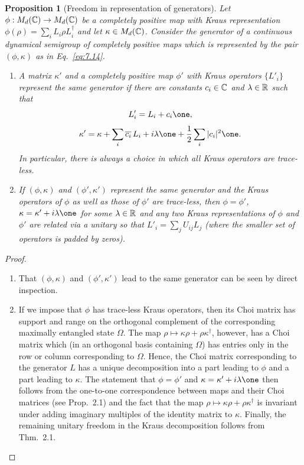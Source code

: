 \documentclass[11pt,a4paper]{article}
\theoremstyle{plain}
\newtheorem{proposition}{Proposition}
\begin{document}
\begin{proposition}[Freedom in representation of generators]
    Let $\phi:M_d(\mathbb{C})\to M_d(\mathbb{C})$ be a completely positive map with Kraus representation $\phi(\rho)=\sum_i L_i\rho L_i^{\dagger}$ and let $\kappa\in M_d(\mathbb{C})$. Consider the generator of a continuous dynamical semigroup of completely positive maps which is represented by the pair $(\phi,\kappa)$ as in Eq.~\eqref{eq:7.14}.
    \begin{enumerate}
        \item A matrix $\kappa'$ and a completely positive map $\phi'$ with Kraus operators $\{L'_i\}$ represent the same generator if there are constants $c_i\in\mathbb{C}$ and $\lambda\in\mathbb{R}$ such that
              \begin{equation}\label{eq:7.18}
                  L'_i = L_i + c_i\one,
              \end{equation}
              \begin{equation}\label{eq:7.19}
                  \kappa' = \kappa + \sum_i \overline{c_i}\,L_i + i\lambda\one + \frac12\sum_i |c_i|^2\one.
              \end{equation}
              In particular, there is always a choice in which all Kraus operators are trace-less.
        \item If $(\phi,\kappa)$ and $(\phi',\kappa')$ represent the same generator and the Kraus operators of $\phi$ as well as those of $\phi'$ are trace-less, then $\phi=\phi'$, $\kappa=\kappa'+i\lambda\one$ for some $\lambda\in\mathbb{R}$ and any two Kraus representations of $\phi$ and $\phi'$ are related via a unitary so that $L'_i=\sum_j U_{ij}L_j$ (where the smaller set of operators is padded by zeros).
    \end{enumerate}
\end{proposition}

\begin{proof}
    \begin{enumerate}
        \item That $(\phi,\kappa)$ and $(\phi',\kappa')$ lead to the same generator can be seen by direct inspection.
        \item If we impose that $\phi$ has trace-less Kraus operators, then its Choi matrix has support and range on the orthogonal complement of the corresponding maximally entangled state $\Omega$. The map $\rho\mapsto \kappa\rho+\rho\kappa^{\dagger}$, however, has a Choi matrix which (in an orthogonal basis containing $\Omega$) has entries only in the row or column corresponding to $\Omega$. Hence, the Choi matrix corresponding to the generator $L$ has a unique decomposition into a part leading to $\phi$ and a part leading to $\kappa$. The statement that $\phi=\phi'$ and $\kappa=\kappa'+i\lambda\one$ then follows from the one-to-one correspondence between maps and their Choi matrices (see Prop.~2.1) and the fact that the map $\rho\mapsto \kappa\rho+\rho\kappa^{\dagger}$ is invariant under adding imaginary multiples of the identity matrix to $\kappa$. Finally, the remaining unitary freedom in the Kraus decomposition follows from Thm.~2.1.
    \end{enumerate}
\end{proof}
\end{document}
